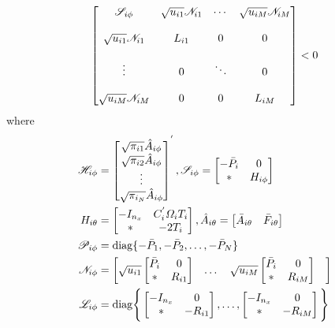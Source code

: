\documentclass[conference]{IEEEtran}
\begin{document}
\begin{equation}\notag
\begin{bmatrix}
	\mathscr{S}_{i\phi}&
	\sqrt{u_{i1}}\mathscr{N}_{i1}&
	\cdots&
	\sqrt{u_{iM}}\mathscr{N}_{iM}\\  \\
	\sqrt{u_{i1}}\mathscr{N}_{i1}&
	L_{i1}&0&0\\  \\
	\vdots&0&\ddots&0\\  \\
	\sqrt{u_{iM}}\mathscr{N}_{iM}&0&0&L_{iM}
				 
\end{bmatrix}<0
\end{equation}
where \\
\begin{equation}\notag
	\begin{aligned}
		\mathscr{H}_{i\phi}&=\begin{bmatrix}
			\sqrt{\pi_{i1}}\hat{A}_{i\phi}\\
			\sqrt{\pi_{i2}}\hat{A}_{i\phi}\\
			\vdots\\
			\sqrt{\pi_{i_N}}\hat{A}_{i\phi}
		\end{bmatrix}^{'},
		\mathscr{S}_{i\phi} = \begin{bmatrix}
			-\bar{P}_{i}&0\\
			*&H_{i\phi}
		\end{bmatrix}\\
		H_{i\theta}&=\begin{bmatrix}
			-I_{n_x}&C^{'}_{i}\varOmega_{i}T_{i} \\
			*&-2T_{i}
		\end{bmatrix},
		\hat{A}_{i\theta}=\begin{bmatrix}
			\bar{A}_{i\theta}&\bar{F}_{i\theta}
		\end{bmatrix}  \\
		\mathscr{P}_{i\phi}&=\mathrm{diag} \{-\bar{P}_{1},-\bar{P}_{2},\dots,-\bar{P}_{N}  \}\\
		\mathscr{N}_{i\phi}&=\begin{bmatrix}
				\sqrt{u_{i1}}\begin{bmatrix}
				\bar{P}_{i}&0\\
				*&R_{i1}
			\end{bmatrix}&
			\dots&	
			\sqrt{u_{iM}}\begin{bmatrix}
				\bar{P}_{i}&0\\
				*&R_{iM}
			\end{bmatrix}&
		\end{bmatrix} \\
		\mathscr{L}_{i\phi}&=\mathrm{diag}\Bigg\{\begin{bmatrix}
			-I_{n_x}&0\\
			*&-R_{i1}
		\end{bmatrix},\dots,
		\begin{bmatrix}
			-I_{n_x}&0\\
			*&-R_{iM}
		\end{bmatrix}  \Bigg\} 
	\end{aligned}
\end{equation}
\end{document}

